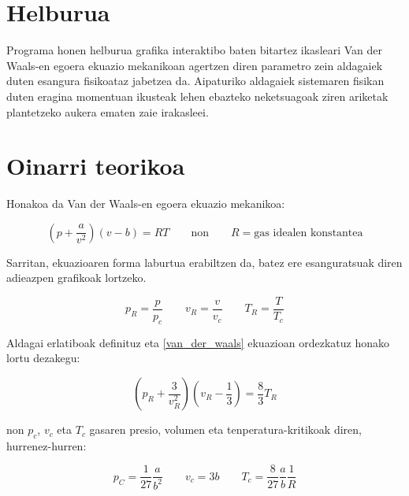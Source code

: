 \documentclass[10pt,a4paper]{article}
\begin{document}
\newpage

\maketitle
\thispagestyle{fancy}

\section{Helburua}
Programa honen helburua grafika interaktibo baten bitartez ikasleari Van der Waals-en egoera ekuazio mekanikoan agertzen diren parametro zein aldagaiek duten esangura fisikoataz jabetzea da. Aipaturiko aldagaiek sistemaren fisikan duten eragina momentuan ikusteak lehen ebazteko neketsuagoak ziren ariketak plantetzeko aukera ematen zaie irakasleei.
\\

\section{Oinarri teorikoa}
Honakoa da Van der Waals-en egoera ekuazio mekanikoa:

\begin{equation}\label{van_der_waals}
\left( p + \frac{a}{v^2} \right) ( v- b) = RT \qquad \text{non} \qquad R = \text{gas idealen konstantea}
\end{equation}

Sarritan, ekuazioaren forma laburtua erabiltzen da, batez ere esanguratsuak diren adieazpen grafikoak lortzeko.

\begin{equation}
p_R = \frac{p}{p_c} \qquad v_R = \frac{v}{v_c} \qquad T_R = \frac{T}{T_c}
\end{equation}

Aldagai erlatiboak definituz eta \ref{van_der_waals} ekuazioan ordezkatuz honako lortu dezakegu:

\begin{equation}\label{van_der_waals_R}
\left( p_R + \frac{3}{v_R^2} \right) ( v_R - \frac{1}{3}) = \frac{8}{3} T_R 
\end{equation}

non $p_c$, $v_c$ eta $T_c$ gasaren presio, volumen eta tenperatura-kritikoak diren, hurrenez-hurren:

\begin{equation}
p_C = \frac{1}{27} \frac{a}{b^2} \qquad v_c = 3b \qquad T_c = \frac{8}{27}\frac{a}{b}\frac{1}{R}
\end{equation}
\end{document}
